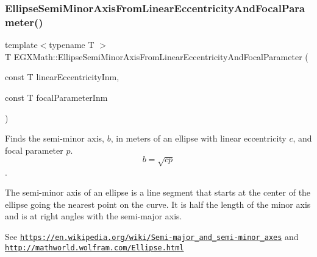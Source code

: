 \mbox{\label{group___e_g_x_math-_geometry-2_d-_ellipse-_semi_minor_axis_ga03cbc96729f84c9691bf1c5bfcc6b083}} 
\subsubsection{\texorpdfstring{Ellipse\+Semi\+Minor\+Axis\+From\+Linear\+Eccentricity\+And\+Focal\+Parameter()}{EllipseSemiMinorAxisFromLinearEccentricityAndFocalParameter()}}
{\footnotesize\ttfamily template$<$typename T $>$ \\
T E\+G\+X\+Math\+::\+Ellipse\+Semi\+Minor\+Axis\+From\+Linear\+Eccentricity\+And\+Focal\+Parameter (\begin{DoxyParamCaption}\item[{const T}]{linear\+Eccentricity\+Inm,  }\item[{const T}]{focal\+Parameter\+Inm }\end{DoxyParamCaption})}



Finds the semi-\/minor axis, $b$, in meters of an ellipse with linear eccentricity $c$, and focal parameter $p$. \[ b=\sqrt{c p} \]. 

The semi-\/minor axis of an ellipse is a line segment that starts at the center of the ellipse going the nearest point on the curve. It is half the length of the minor axis and is at right angles with the semi-\/major axis.

See \href{https://en.wikipedia.org/wiki/Semi-major_and_semi-minor_axes}{\tt https\+://en.\+wikipedia.\+org/wiki/\+Semi-\/major\+\_\+and\+\_\+semi-\/minor\+\_\+axes} and \href{http://mathworld.wolfram.com/Ellipse.html}{\tt http\+://mathworld.\+wolfram.\+com/\+Ellipse.\+html}


